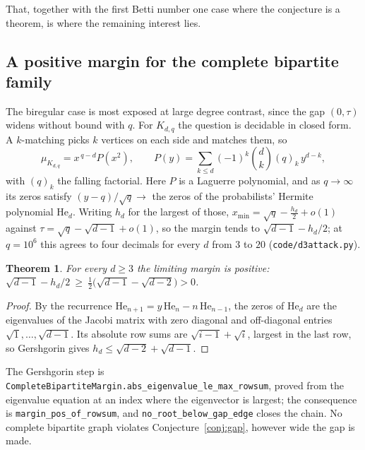 \documentclass[11pt]{article}
\newtheorem{theorem}{Theorem}
\theoremstyle{remark}
\begin{document}
That, together with the first Betti number one case where the conjecture is a theorem, is
where the remaining interest lies.

\subsection{A positive margin for the complete bipartite family}\label{sec:margin}

The biregular case is most exposed at large degree contrast, since the gap $(0,\tau)$ widens
without bound with $q$. For $K_{d,q}$ the question is decidable in closed form. A $k$-matching
picks $k$ vertices on each side and matches them, so
\begin{equation}\label{eq:kdq}
   \mu_{K_{d,q}}=x^{\,q-d}P(x^2),\qquad
   P(y)=\sum_{k\le d}(-1)^k\binom{d}{k}(q)_k\,y^{d-k},
\end{equation}
with $(q)_k$ the falling factorial. Here $P$ is a Laguerre polynomial, and as $q\to\infty$ its
zeros satisfy $(y-q)/\sqrt q\to$ the zeros of the probabilists' Hermite polynomial
$\mathrm{He}_d$. Writing $h_d$ for the largest of those,
$x_{\min}=\sqrt q-\tfrac{h_d}{2}+o(1)$ against $\tau=\sqrt q-\sqrt{d-1}+o(1)$, so the margin
tends to $\sqrt{d-1}-h_d/2$; at $q=10^6$ this agrees to four decimals for every $d$ from $3$ to
$20$ (\texttt{code/d3attack.py}).

\begin{theorem}\label{thm:margin}
For every $d\ge3$ the limiting margin is positive:
$\sqrt{d-1}-h_d/2\ \ge\ \tfrac12\bigl(\sqrt{d-1}-\sqrt{d-2}\bigr)>0$.
\end{theorem}

\begin{proof}
By the recurrence $\mathrm{He}_{n+1}=y\,\mathrm{He}_n-n\,\mathrm{He}_{n-1}$, the zeros of
$\mathrm{He}_d$ are the eigenvalues of the Jacobi matrix with zero diagonal and off-diagonal
entries $\sqrt1,\dots,\sqrt{d-1}$. Its absolute row sums are $\sqrt{i-1}+\sqrt i$, largest in the
last row, so Gershgorin gives $h_d\le\sqrt{d-2}+\sqrt{d-1}$.
\end{proof}

The Gershgorin step is \texttt{CompleteBipartiteMargin.abs\_eigenvalue\_le\_max\_rowsum}, proved
from the eigenvalue equation at an index where the eigenvector is largest; the consequence is
\texttt{margin\_pos\_of\_rowsum}, and \texttt{no\_root\_below\_gap\_edge} closes the chain. No
complete bipartite graph violates Conjecture~\ref{conj:gap}, however wide the gap is made.
\end{document}

